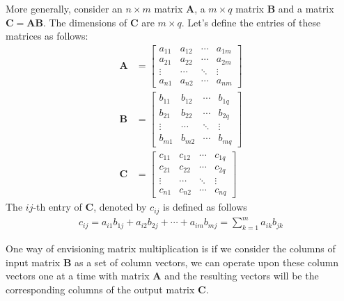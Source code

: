\documentclass{tufte-handout}
\begin{document}
More generally, consider an $n\times m$ matrix $\mathbf{A}$, a $m \times q$ matrix $\mathbf{B}$ and a matrix $\mathbf{C} = \mathbf{AB}$. The dimensions of $\mathbf{C}$ are $m \times q$. Let's define the entries of these matrices as follows:
\begin{align*}
\mathbf{A} &=
\begin{bmatrix}
    a_{11} & a_{12}& \cdots & a_{1m}\\
    a_{21} & a_{22} & \cdots & a_{2m}  \\
    \vdots & \cdots & \ddots & \vdots\\
    a_{n1} & a_{n2} & \cdots & a_{nm}
  \end{bmatrix}
\\
 \mathbf{B} &=
\begin{bmatrix}
    b_{11} & b_{12}& \cdots & b_{1q}\\
    b_{21} & b_{22} & \cdots & b_{2q}  \\
    \vdots & \cdots & \ddots & \vdots\\
    b_{m1} & b_{m2} & \cdots & b_{mq}
  \end{bmatrix}
\\
 \mathbf{C} &=
\begin{bmatrix}
    c_{11} & c_{12}& \cdots & c_{1q}\\
    c_{21} & c_{22} & \cdots & c_{2q}  \\
    \vdots & \cdots & \ddots & \vdots\\
    c_{n1} & c_{n2} & \cdots & c_{nq}
  \end{bmatrix}
\end{align*}
The $ij$-th entry of $\mathbf{C}$, denoted by $c_{ij}$ is defined as follows
\begin{align*}
c_{ij} = a_{i1}b_{1j} + a_{i2}b_{2j} +\cdots + a_{im}b_{mj} = \sum_{k = 1}^m a_{ik}b_{jk}
\end{align*}



One way of envisioning matrix multiplication is if we consider the columns of input matrix $\mathbf{B}$ as a set of column vectors, we can operate upon these column vectors one at a time with matrix $\mathbf{A}$ and the resulting vectors will be the corresponding columns of the output matrix $\mathbf{C}$.
\end{document}
